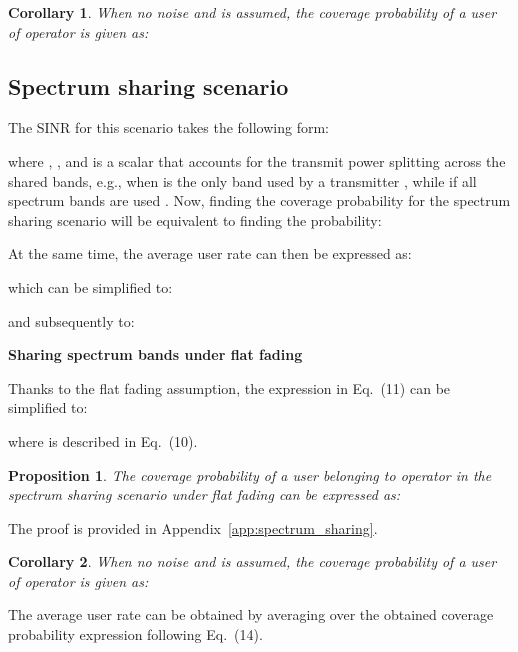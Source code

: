 \documentclass[12pt, journal,doublecolumn, final]{IEEEtran}
\newcommand{\App}[1]{Appendix~\ref{app:#1}}
\newtheorem{proposition}{Proposition}
\newtheorem{corollary}{Corollary}
\begin{document}
\begin{corollary}
When no noise and  is assumed, the coverage probability of a user of operator  is given as:

\label{cor:cp_ppp_roam_nonoise}
\end{corollary}



\subsection{Spectrum sharing scenario}

The \ac{SINR} for this scenario takes the following form:

where , , and  is a scalar that accounts for the transmit power splitting across the shared bands, e.g., when  is the only band used by a transmitter , while if all spectrum bands are used . Now, finding the coverage probability for the spectrum sharing scenario will be equivalent to finding the probability:

At the same time, the average user rate can then be expressed as:

which can be simplified to:

and subsequently to:


\noindent
{\bf Sharing spectrum bands under flat fading}

Thanks to the flat fading assumption, the expression in Eq.~(11) can be simplified to:

where  is described in Eq.~(10).

\begin{proposition}
The coverage probability of a user belonging to operator  in the spectrum sharing scenario under flat fading can be expressed as:

\end{proposition}

\begin{IEEEproof}
The proof is provided in \App{spectrum_sharing}.
\end{IEEEproof}

\begin{corollary}
When no noise and  is assumed, the coverage probability of a user of operator  is given as:

\label{cor:cp_ppp_spec_adj_nonoise}
\end{corollary}

The average user rate can be obtained by averaging over the obtained coverage probability expression following Eq.~(14).
\end{document}
